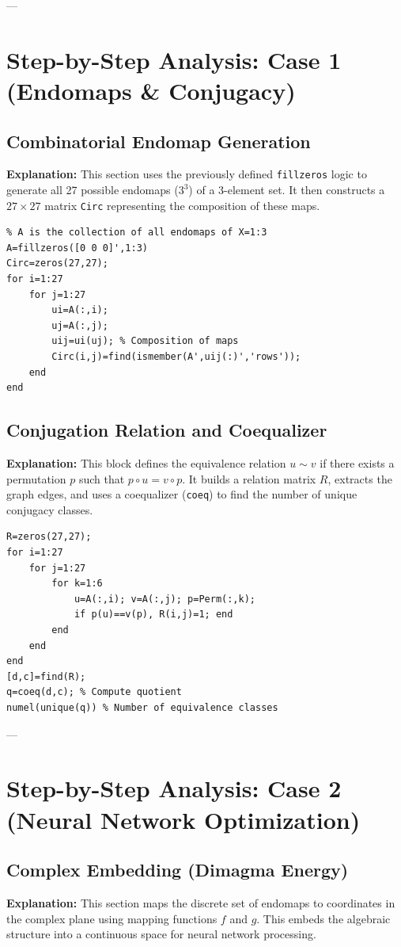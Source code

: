 ---

\section{Step-by-Step Analysis: Case 1 (Endomaps \& Conjugacy)}

\subsection{Combinatorial Endomap Generation}
\textbf{Explanation:} This section uses the previously defined \texttt{fillzeros} logic to generate all 27 possible endomaps ($3^3$) of a 3-element set. It then constructs a $27 \times 27$ matrix \texttt{Circ} representing the composition of these maps.

\begin{lstlisting}
% A is the collection of all endomaps of X=1:3
A=fillzeros([0 0 0]',1:3)
Circ=zeros(27,27);
for i=1:27
    for j=1:27
        ui=A(:,i);
        uj=A(:,j);
        uij=ui(uj); % Composition of maps
        Circ(i,j)=find(ismember(A',uij(:)','rows'));
    end
end
\end{lstlisting}

\subsection{Conjugation Relation and Coequalizer}
\textbf{Explanation:} This block defines the equivalence relation $u \sim v$ if there exists a permutation $p$ such that $p \circ u = v \circ p$. It builds a relation matrix $R$, extracts the graph edges, and uses a coequalizer (\texttt{coeq}) to find the number of unique conjugacy classes.

\begin{lstlisting}
R=zeros(27,27);
for i=1:27
    for j=1:27
        for k=1:6
            u=A(:,i); v=A(:,j); p=Perm(:,k);
            if p(u)==v(p), R(i,j)=1; end
        end
    end
end
[d,c]=find(R);
q=coeq(d,c); % Compute quotient
numel(unique(q)) % Number of equivalence classes
\end{lstlisting}

---

\section{Step-by-Step Analysis: Case 2 (Neural Network Optimization)}

\subsection{Complex Embedding (Dimagma Energy)}
\textbf{Explanation:} This section maps the discrete set of endomaps to coordinates in the complex plane using mapping functions $f$ and $g$. This embeds the algebraic structure into a continuous space for neural network processing.

